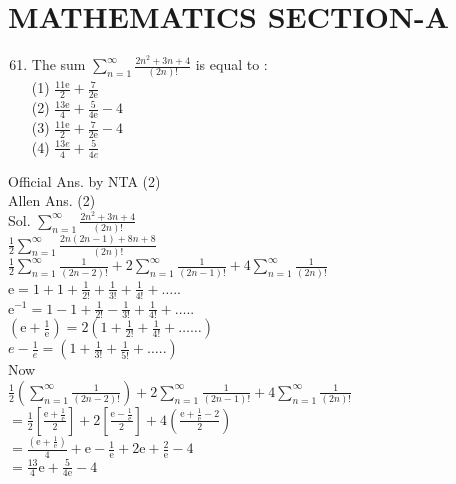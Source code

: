 \documentclass[10pt]{article}
\begin{document}
\section*{MATHEMATICS SECTION-A}
\begin{enumerate}
  \setcounter{enumi}{60}
  \item The sum \(\sum_{n=1}^{\infty} \frac{2 n^{2}+3 n+4}{(2 n)!}\) is equal to :\\
(1) \(\frac{11 \mathrm{e}}{2}+\frac{7}{2 \mathrm{e}}\)\\
(2) \(\frac{13 \mathrm{e}}{4}+\frac{5}{4 \mathrm{e}}-4\)\\
(3) \(\frac{11 \mathrm{e}}{2}+\frac{7}{2 \mathrm{e}}-4\)\\
(4) \(\frac{13 e}{4}+\frac{5}{4 e}\)
\end{enumerate}

Official Ans. by NTA (2)\\
Allen Ans. (2)\\
Sol. \(\sum_{n=1}^{\infty} \frac{2 n^{2}+3 n+4}{(2 n)!}\)\\
\(\frac{1}{2} \sum_{n=1}^{\infty} \frac{2 n(2 n-1)+8 n+8}{(2 n)!}\)\\
\(\frac{1}{2} \sum_{n=1}^{\infty} \frac{1}{(2 n-2)!}+2 \sum_{n=1}^{\infty} \frac{1}{(2 n-1)!}+4 \sum_{n=1}^{\infty} \frac{1}{(2 n)!}\)\\
\(\mathrm{e}=1+1+\frac{1}{2!}+\frac{1}{3!}+\frac{1}{4!}+\ldots .\).\\
\(\mathrm{e}^{-1}=1-1+\frac{1}{2!}-\frac{1}{3!}+\frac{1}{4!}+\ldots .\).\\
\(\left(\mathrm{e}+\frac{1}{\mathrm{e}}\right)=2\left(1+\frac{1}{2!}+\frac{1}{4!}+\ldots \ldots\right)\)\\
\(e-\frac{1}{e}=\left(1+\frac{1}{3!}+\frac{1}{5!}+\ldots ..\right)\)\\
Now\\
\(\frac{1}{2}\left(\sum_{n=1}^{\infty} \frac{1}{(2 n-2)!}\right)+2 \sum_{n=1}^{\infty} \frac{1}{(2 n-1)!}+4 \sum_{n=1}^{\infty} \frac{1}{(2 n)!}\)\\
\(=\frac{1}{2}\left[\frac{\mathrm{e}+\frac{1}{\mathrm{e}}}{2}\right]+2\left[\frac{\mathrm{e}-\frac{1}{\mathrm{e}}}{2}\right]+4\left(\frac{\mathrm{e}+\frac{1}{\mathrm{e}}-2}{2}\right)\)\\
\(=\frac{\left(\mathrm{e}+\frac{1}{\mathrm{e}}\right)}{4}+\mathrm{e}-\frac{1}{\mathrm{e}}+2 \mathrm{e}+\frac{2}{\mathrm{e}}-4\)\\
\(=\frac{13}{4} \mathrm{e}+\frac{5}{4 \mathrm{e}}-4\)
\end{document}
